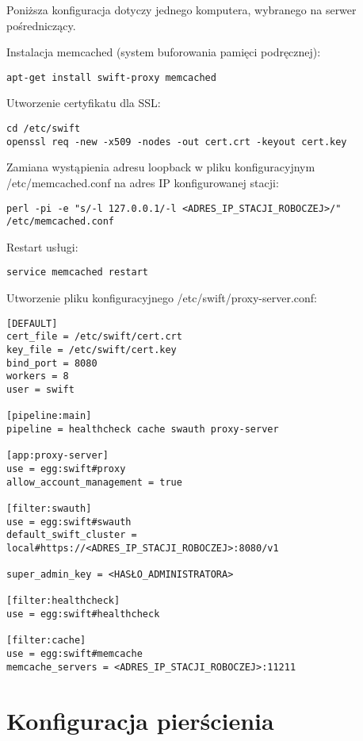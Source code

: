 \documentclass[12pt]{article}
\begin{document}
Poniższa konfiguracja dotyczy jednego komputera, wybranego na serwer pośredniczący.

Instalacja memcached (system buforowania pamięci podręcznej):

\begin{verbatim}
apt-get install swift-proxy memcached
\end{verbatim}

Utworzenie certyfikatu dla SSL:

\begin{verbatim}
cd /etc/swift
openssl req -new -x509 -nodes -out cert.crt -keyout cert.key
\end{verbatim}

Zamiana wystąpienia adresu loopback w pliku konfiguracyjnym /etc/memcached.conf na adres IP konfigurowanej stacji:

\begin{verbatim}
perl -pi -e "s/-l 127.0.0.1/-l <ADRES_IP_STACJI_ROBOCZEJ>/" /etc/memcached.conf
\end{verbatim}

Restart usługi:

\begin{verbatim}
service memcached restart
\end{verbatim}

Utworzenie pliku konfiguracyjnego /etc/swift/proxy-server.conf:

\begin{verbatim}
[DEFAULT]
cert_file = /etc/swift/cert.crt
key_file = /etc/swift/cert.key
bind_port = 8080
workers = 8
user = swift

[pipeline:main]
pipeline = healthcheck cache swauth proxy-server

[app:proxy-server]
use = egg:swift#proxy
allow_account_management = true

[filter:swauth]
use = egg:swift#swauth
default_swift_cluster = local#https://<ADRES_IP_STACJI_ROBOCZEJ>:8080/v1

super_admin_key = <HASŁO_ADMINISTRATORA>

[filter:healthcheck]
use = egg:swift#healthcheck

[filter:cache]
use = egg:swift#memcache
memcache_servers = <ADRES_IP_STACJI_ROBOCZEJ>:11211
\end{verbatim}

\section{Konfiguracja pierścienia}
\end{document}
